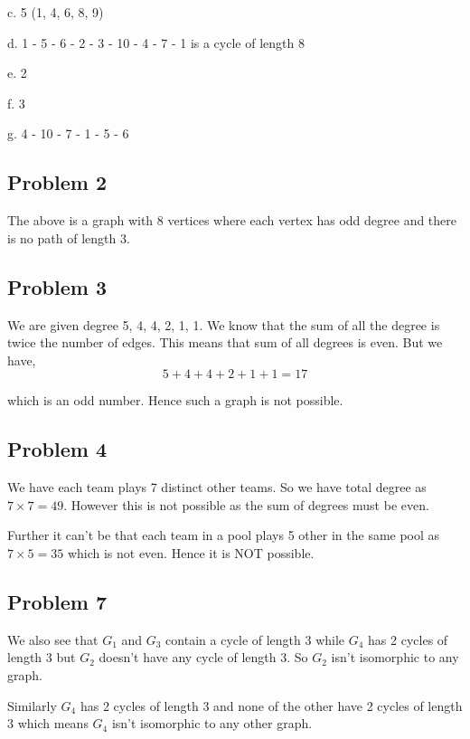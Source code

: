 \documentclass[a4paper]{report}
\begin{document}
c. 5 (1, 4, 6, 8, 9)

d. 1 - 5 - 6 - 2 - 3 - 10 - 4 - 7 - 1 is a cycle of length 8

e. 2

f. 3

g. 4 - 10 - 7 - 1 - 5 - 6


\subsection*{Problem 2}

The above is a graph with 8 vertices where each vertex has odd degree  and there is no path of length 3.

\subsection*{Problem 3}
We are given degree 5, 4, 4, 2, 1, 1. We know that the sum of all the degree is twice the number of edges. This means that sum of all degrees is even. But we have, 
$$ 5 + 4 + 4 + 2 + 1 + 1 = 17 $$ 

which is an odd number. Hence such a graph is not possible.
\subsection*{Problem 4}


We have each team plays 7 distinct other teams. So we have total degree as $7 \times  7 = 49$. However this is not possible as the sum of degrees must be even.

Further it can't be that each team in a pool plays 5 other in the same pool as $7 \times  5 = 35$  which is not even. Hence it is NOT possible.
\subsection*{Problem 7}
We also see that $G_1$ and $G_3$ contain a cycle of length 3 while $G_4$ has 2 cycles of length 3 but $G_2$ doesn't have any cycle of length 3. So $G_2$ isn't isomorphic to any graph.

Similarly $G_4$ has 2 cycles of length 3 and none of the other have 2 cycles of length 3 which means $G_4$ isn't isomorphic to any other graph.
\end{document}
